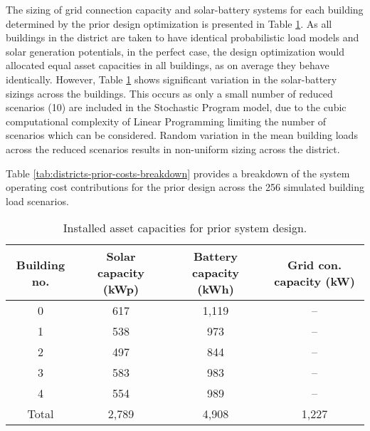 \begin{subappendices}

    The sizing of grid connection capacity and solar-battery systems for each building determined by the prior design optimization is presented in Table \ref{tab:districts-prior-design}. As all buildings in the district are taken to have identical probabilistic load models and solar generation potentials, in the perfect case, the design optimization would allocated equal asset capacities in all buildings, as on average they behave identically. However, Table \ref{tab:districts-prior-design} shows significant variation in the solar-battery sizings across the buildings. This occurs as only a small number of reduced scenarios (10) are included in the Stochastic Program model, due to the cubic computational complexity of Linear Programming limiting the number of scenarios which can be considered. Random variation in the mean building loads across the reduced scenarios results in non-uniform sizing across the district.

    Table \ref{tab:districts-prior-costs-breakdown} provides a breakdown of the system operating cost contributions for the prior design across the 256 simulated building load scenarios.\\

    \begin{table}[h]
        \centering
        \renewcommand{\arraystretch}{1}
        \begin{tabular}{c|ccc} \toprule \toprule
            Building no. & Solar capacity (kWp) & Battery capacity (kWh) & Grid con. capacity (kW) \\
            \midrule \midrule
            0 & 617 & 1,119 & -- \\
            1 & 538 & 973 & -- \\
            2 & 497 & 844 & -- \\
            3 & 583 & 983 & -- \\
            4 & 554 & 989 & -- \\ \midrule
            Total & 2,789 & 4,908 & 1,227 \\
            \bottomrule \bottomrule
        \end{tabular}
        \smallskip
        \caption{Installed asset capacities for prior system design.}
        \label{tab:districts-prior-design}
    \end{table}


\end{subappendices}
